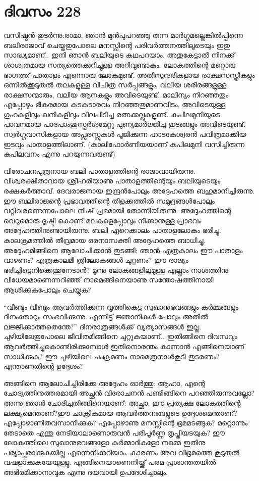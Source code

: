 \section{ദിവസം 228}


വസിഷ്ഠൻ തുടർന്നു:രാമാ, ഞാൻ മുൻപുപറഞ്ഞു തന്ന മാർഗ്ഗമല്ലെങ്കിൽപ്പിന്നെ ബലിരാജാവ് ചെയ്തതുപോലെ മനസ്സിന്റെ പരിവർത്തനത്തിലൂടെയും ഇതു സാദ്ധ്യമാണ്‌.. ഇനി ഞാൻ ബലിയുടെ കഥപറയാം. അതുകേട്ടാൽ നിനക്ക് ശാശ്വതമായ സത്യത്തെക്കുറിച്ചുള്ള അറിവുണ്ടാകും. ലോകത്തിന്റെ മറ്റൊരു ഭാഗത്ത് പാതാളം എന്നൊരു ലോകമുണ്ട്. അതിസുന്ദരികളായ രാക്ഷസസ്ത്രീകളും ഒന്നില്‍ക്കൂടുതൽ തലകളുള്ള വിചിത്ര സർപ്പങ്ങളും, വലിയ ശരീരങ്ങളുള്ള രാക്ഷസന്മാരും, വലിയ ആനകളും അവിടെയുണ്ട്. മാലിന്യം നിറഞ്ഞതും എപ്പോഴും ഭീകരമായ കടകടാരവം നിറഞ്ഞതുമാണവിടം. അവിടെയുള്ള ഗുഹകളിലും ഖനികളിലും വിലപിടിച്ച രത്നക്കല്ലുകളുണ്ട്. കപിലമുനിയുടെ പാവനമായ പാദപാംശുസ്പർശമേറ്റു പുണ്യമാർജ്ജിച്ച ഇടങ്ങളും അവിടെയുണ്ട്. സ്വർഗ്ഗവാസികളായ അപ്സരസ്സുകൾ പൂജിക്കുന്ന ഹാടകേശ്വരൻ പവിത്രമാക്കിയ ഇടവും പാതാളത്തിലാണ്. (കാലിഫോർണിയയാണ്‌ കപിലമുനി വസിച്ചിരുന്ന കപിലവനം എന്നു പറയുന്നവരുണ്ട്)

വിരോചനപുത്രനായ ബലി പാതാളത്തിന്റെ രാജാവായിരുന്നു. വിശ്വരക്ഷിതാവായ ശ്രീഹരിയാണു പാതാളത്തിന്റെയും ബലിയുടെയും രക്ഷകർത്താവ്. ദേവരാജനായ ഇന്ദ്രൻപോലും അദ്ദേഹത്തെ ബഹുമാനിച്ചിരുന്നു. ഈ ബലിരാജന്റെ പ്രഭാവത്തിന്റെ തിളക്കത്തിൽ സമുദ്രങ്ങൾപോലും വറ്റിവരണ്ടെന്നപോലെ നിഷ് പ്രഭമായി തോന്നിയിരുന്നു. അദ്ദേഹത്തിന്റെ വെറുമൊരു ദൃഷ്ടി കൊണ്ട് മലകളെപ്പോലും നീക്കാനുള്ള പ്രാഭവം അദ്ദേഹത്തിനുണ്ടായിരുന്നു. ബലി ഏറെക്കാലം പാതാളലോകം ഭരിച്ചു. കാലക്രമത്തിൽ തീവ്രമായ ഒരനാസക്തി അദ്ദേഹത്തെ ബാധിച്ചു. അദ്ദേഹമിങ്ങിനെ ആലോചിക്കാൻ തുടങ്ങി: ഞാൻ എത്രകാലം ഈ പാതാളം വാഴണം? എത്രകാലമീ ത്രിലോകങ്ങൾ ചുറ്റണം? ഈ രാജ്യം ഭരിച്ചിട്ടെനിക്കെന്തുനേടാൻ? മൂന്നു ലോകങ്ങളിലുമുള്ള എല്ലാം നാശത്തിനു വിധേയമാണെന്നറിഞ്ഞ് നാമെങ്ങിനെയാണു സന്തോഷത്തിനായി ആശിക്കുകപോലും ചെയ്യുക?

“വീണ്ടും വീണ്ടും ആവർത്തിക്കുന്ന വൃത്തികെട്ട സുഖാനുഭവങ്ങളും കർമ്മങ്ങളും ദിനംതോറും സംഭവിക്കുന്നു. എന്നിട്ട് ജ്ഞാനികൾ പോലും അതിൽ ലജ്ജിക്കാത്തതെന്തേ?” ദിനരാത്രങ്ങൾക്ക് വ്യത്യാസങ്ങൾ ഇല്ല. ചുഴിയിലേതുപോലെ ജീവിതമിങ്ങിനെ ചുറ്റുകയാണ്‌.. ഇതിങ്ങിനെ ദിവസവും ആവർത്തിച്ചുകൊണ്ടിരിക്കുമ്പോൾ ഇതിനൊരന്തം കാണാൻ എങ്ങിനെയാണ് സാധിക്കുക? ഈ ചുഴിയിലെ ചംക്രമണം നാമെത്രനാൾകൂടി തുടരണം? എന്താണതിന്റെ ഉദ്ദേശം?

അങ്ങിനെ ആലോചിച്ചിരിക്കേ അദ്ദേഹം ഓർത്തു: ആഹാ, എന്റെ ചോദ്യത്തിനുത്തരമായി അച്ഛൻ വിരോചനൻ പണ്ടിങ്ങിനെ പറഞ്ഞിരുന്നുവല്ലോ? അന്നു ഞാൻ ചോദിച്ചതിങ്ങിനെയാണ്: അച്ഛാ, ഈ പ്രത്യക്ഷ ലോകത്തിന്റെ ലക്ഷ്യമെന്താണ്‌?ഈ ചാക്രികമായ ആവർത്തനങ്ങളുടെ ഉദ്ദേശമെന്താണ്‌? എപ്പോഴാണിതവസാനിക്കുക? എപ്പോഴാണു മനസ്സിന്റെ ഭ്രമമടങ്ങുക? മറ്റൊന്നും തേടാതെ എന്തു നേടിയാലാണൊരുവൻ പരിപൂർണ്ണ തൃപ്തിയടയുക? ഈ ലോകത്തിലെ സുഖാനുഭവങ്ങളോ കർമ്മാദികളോ നമ്മെ ഇതിനു പര്യാപ്തരാക്കുകയില്ല എന്നെനിക്കറിയാം. കാരണം അവ വിഭ്രമത്തെ കൂടുതൽ വഷളാക്കുകയേയുള്ളു. എങ്ങിനെയാണെനിയ്ക്ക് പരമ പ്രശാന്തതയിൽ അഭിരമിക്കാനാവുക എന്നു ദയവായി ഉപദേശിച്ചാലും. 
